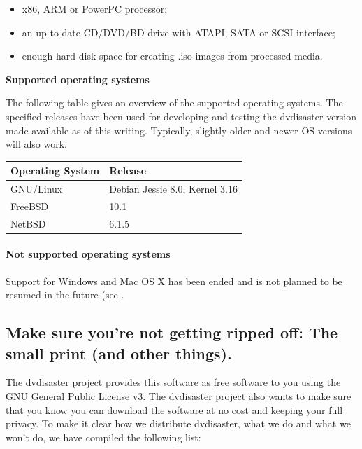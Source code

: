 \begin{itemize}
\item x86, ARM or PowerPC processor;
\item an up-to-date CD/DVD/BD drive with ATAPI, SATA or SCSI interface;
\item enough hard disk space for creating .iso images from processed media.
\end{itemize}

\bigskip

{\bf Supported operating systems}\quad

\medskip

The following table gives an overview of the supported operating systems.
The specified releases have been used for developing and testing the
dvdisaster version made available as of this writing. 
Typically, slightly older and newer OS versions will also work.
\label{download-requirements-freebsd}

\bigskip

\begin{tabular}{|l|l|}
\hline
Operating System & Release \\
\hline
GNU/Linux & Debian Jessie 8.0,  Kernel 3.16 \\
\hline
FreeBSD & 10.1 \\
\hline
NetBSD & 6.1.5 \\
\hline
\end{tabular}

\bigskip

\paragraph{Not supported operating systems}\quad

\medskip

Support for Windows and Mac OS X has been ended
and is not planned to be resumed in the
future (see . 

\newpage
\subsection{Make sure you're not getting ripped off: The small print (and other things).}
\label{download-terms}

The dvdisaster project provides this software
as \href{http://fsfe.org/about/basics/freesoftware.en.html}{free software} to you using
the \href{http://www.gnu.org/licenses/gpl-3.0.txt}{GNU General Public License v3}.
The dvdisaster project also wants to make sure that you know you can download
the software at no cost and keeping your full privacy.
To make it clear how we distribute dvdisaster, what we do and what we
won't do, we have compiled the following list:

